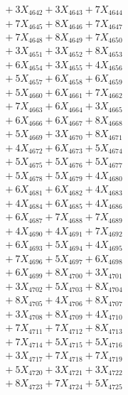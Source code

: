 \documentclass[a4paper,10pt]{article}
\begin{document}
{\begin{align}
&\;  + 3 X_{4642} + 3 X_{4643} + 7 X_{4644} \\[0.3ex]
&\;  + 7 X_{4645} + 8 X_{4646} + 7 X_{4647} \\[0.3ex]
&\;  + 7 X_{4648} + 8 X_{4649} + 7 X_{4650} \\[0.3ex]
&\;  + 3 X_{4651} + 3 X_{4652} + 8 X_{4653} \\[0.3ex]
&\;  + 6 X_{4654} + 3 X_{4655} + 4 X_{4656} \\[0.3ex]
&\;  + 5 X_{4657} + 6 X_{4658} + 6 X_{4659} \\[0.5ex]\allowbreak
&\;  + 5 X_{4660} + 6 X_{4661} + 7 X_{4662} \\[0.3ex]
&\;  + 7 X_{4663} + 6 X_{4664} + 3 X_{4665} \\[0.3ex]
&\;  + 6 X_{4666} + 6 X_{4667} + 8 X_{4668} \\[0.3ex]
&\;  + 5 X_{4669} + 3 X_{4670} + 8 X_{4671} \\[0.3ex]
&\;  + 4 X_{4672} + 6 X_{4673} + 5 X_{4674} \\[0.3ex]
&\;  + 5 X_{4675} + 5 X_{4676} + 5 X_{4677} \\[0.3ex]
&\;  + 5 X_{4678} + 5 X_{4679} + 4 X_{4680} \\[0.3ex]
&\;  + 6 X_{4681} + 6 X_{4682} + 4 X_{4683} \\[0.3ex]
&\;  + 4 X_{4684} + 6 X_{4685} + 4 X_{4686} \\[0.3ex]
&\;  + 6 X_{4687} + 7 X_{4688} + 7 X_{4689} \\[0.5ex]\allowbreak
&\;  + 4 X_{4690} + 4 X_{4691} + 7 X_{4692} \\[0.3ex]
&\;  + 6 X_{4693} + 5 X_{4694} + 4 X_{4695} \\[0.3ex]
&\;  + 7 X_{4696} + 5 X_{4697} + 6 X_{4698} \\[0.3ex]
&\;  + 6 X_{4699} + 8 X_{4700} + 3 X_{4701} \\[0.3ex]
&\;  + 3 X_{4702} + 5 X_{4703} + 8 X_{4704} \\[0.3ex]
&\;  + 8 X_{4705} + 4 X_{4706} + 8 X_{4707} \\[0.3ex]
&\;  + 3 X_{4708} + 8 X_{4709} + 4 X_{4710} \\[0.3ex]
&\;  + 7 X_{4711} + 7 X_{4712} + 8 X_{4713} \\[0.3ex]
&\;  + 7 X_{4714} + 5 X_{4715} + 5 X_{4716} \\[0.3ex]
&\;  + 3 X_{4717} + 7 X_{4718} + 7 X_{4719} \\[0.5ex]\allowbreak
&\;  + 5 X_{4720} + 3 X_{4721} + 3 X_{4722} \\[0.3ex]
&\;  + 8 X_{4723} + 7 X_{4724} + 5 X_{4725} \\[0.3ex]

\end{align}}
\end{document}
